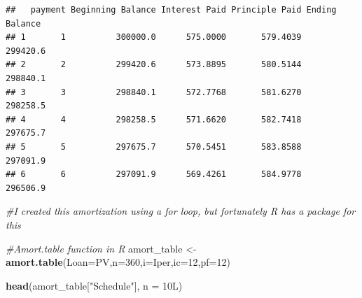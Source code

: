 \documentclass[]{article}
\newenvironment{Shaded}{\begin{snugshade}}{\end{snugshade}}
\newcommand{\CommentTok}[1]{\textcolor[rgb]{0.56,0.35,0.01}{\textit{#1}}}
\newcommand{\DataTypeTok}[1]{\textcolor[rgb]{0.13,0.29,0.53}{#1}}
\newcommand{\DecValTok}[1]{\textcolor[rgb]{0.00,0.00,0.81}{#1}}
\newcommand{\KeywordTok}[1]{\textcolor[rgb]{0.13,0.29,0.53}{\textbf{#1}}}
\newcommand{\NormalTok}[1]{#1}
\newcommand{\StringTok}[1]{\textcolor[rgb]{0.31,0.60,0.02}{#1}}
\begin{document}
\begin{verbatim}
##   payment Beginning Balance Interest Paid Principle Paid Ending Balance
## 1       1          300000.0      575.0000       579.4039       299420.6
## 2       2          299420.6      573.8895       580.5144       298840.1
## 3       3          298840.1      572.7768       581.6270       298258.5
## 4       4          298258.5      571.6620       582.7418       297675.7
## 5       5          297675.7      570.5451       583.8588       297091.9
## 6       6          297091.9      569.4261       584.9778       296506.9
\end{verbatim}

\begin{Shaded}
\begin{Highlighting}[]
\CommentTok{#I created this amortization using a for loop, but fortunately R has a package for this}

\CommentTok{#Amort.table function in R}
\NormalTok{amort_table <-}\StringTok{ }\KeywordTok{amort.table}\NormalTok{(}\DataTypeTok{Loan=}\NormalTok{PV,}\DataTypeTok{n=}\DecValTok{360}\NormalTok{,}\DataTypeTok{i=}\NormalTok{Iper,}\DataTypeTok{ic=}\DecValTok{12}\NormalTok{,}\DataTypeTok{pf=}\DecValTok{12}\NormalTok{)}

\KeywordTok{head}\NormalTok{(amort_table[}\StringTok{"Schedule"}\NormalTok{], }\DataTypeTok{n =}\NormalTok{ 10L)}
\end{Highlighting}
\end{Shaded}
\end{document}
